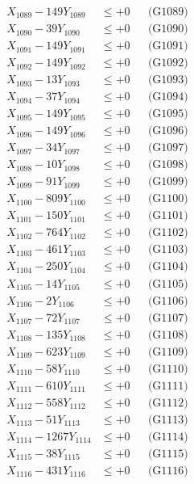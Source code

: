 \documentclass[a4paper,10pt]{article}
\begin{document}
{\begin{align}
X_{1089} - 149Y_{1089} &\leq +0 && \text{(G1089)} \\
X_{1090} - 39Y_{1090} &\leq +0 && \text{(G1090)} \\
\allowbreak
X_{1091} - 149Y_{1091} &\leq +0 && \text{(G1091)} \\
X_{1092} - 149Y_{1092} &\leq +0 && \text{(G1092)} \\
X_{1093} - 13Y_{1093} &\leq +0 && \text{(G1093)} \\
X_{1094} - 37Y_{1094} &\leq +0 && \text{(G1094)} \\
X_{1095} - 149Y_{1095} &\leq +0 && \text{(G1095)} \\
X_{1096} - 149Y_{1096} &\leq +0 && \text{(G1096)} \\
X_{1097} - 34Y_{1097} &\leq +0 && \text{(G1097)} \\
X_{1098} - 10Y_{1098} &\leq +0 && \text{(G1098)} \\
X_{1099} - 91Y_{1099} &\leq +0 && \text{(G1099)} \\
X_{1100} - 809Y_{1100} &\leq +0 && \text{(G1100)} \\
\allowbreak
X_{1101} - 150Y_{1101} &\leq +0 && \text{(G1101)} \\
X_{1102} - 764Y_{1102} &\leq +0 && \text{(G1102)} \\
X_{1103} - 461Y_{1103} &\leq +0 && \text{(G1103)} \\
X_{1104} - 250Y_{1104} &\leq +0 && \text{(G1104)} \\
X_{1105} - 14Y_{1105} &\leq +0 && \text{(G1105)} \\
X_{1106} - 2Y_{1106} &\leq +0 && \text{(G1106)} \\
X_{1107} - 72Y_{1107} &\leq +0 && \text{(G1107)} \\
X_{1108} - 135Y_{1108} &\leq +0 && \text{(G1108)} \\
X_{1109} - 623Y_{1109} &\leq +0 && \text{(G1109)} \\
X_{1110} - 58Y_{1110} &\leq +0 && \text{(G1110)} \\
\allowbreak
X_{1111} - 610Y_{1111} &\leq +0 && \text{(G1111)} \\
X_{1112} - 558Y_{1112} &\leq +0 && \text{(G1112)} \\
X_{1113} - 51Y_{1113} &\leq +0 && \text{(G1113)} \\
X_{1114} - 1267Y_{1114} &\leq +0 && \text{(G1114)} \\
X_{1115} - 38Y_{1115} &\leq +0 && \text{(G1115)} \\
X_{1116} - 431Y_{1116} &\leq +0 && \text{(G1116)} \\

\end{align}}
\end{document}
